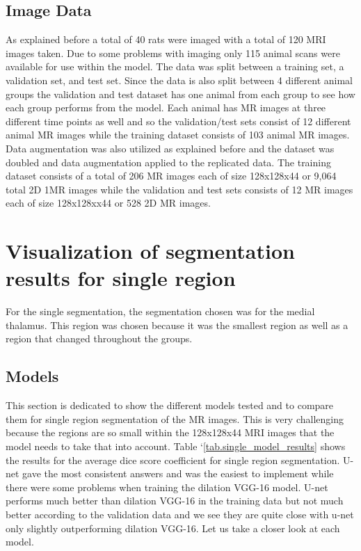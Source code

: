 \subsection{Image Data}
    As explained before a total of 40 rats were imaged with a total of 120 MRI images taken. 
    Due to some problems with imaging only 115 animal scans were available for use within the model. 
    The data was split between a training set, a validation set, and test set. 
    Since the data is also split between 4 different animal groups the validation and test dataset has one animal from each group to see how each group performs from the model. 
   Each animal has MR images at three different time points as well and so the validation/test sets consist of 12 different animal MR images while the training dataset consists of 103 animal MR images. 
    Data augmentation was also utilized as explained before and the dataset was doubled and data augmentation applied to the replicated data. 
    The training dataset consists of a total of 206 MR images each of size 128x128x44 or 9,064 total 2D 1MR images while the validation and test sets consists of 12 MR images each of size 128x128xx44 or 528 2D MR images. 

\section{Visualization of segmentation results for single region}
    For the single segmentation, the segmentation chosen was for the medial thalamus. 
    This region was chosen because it was the smallest region as well as a region that changed throughout the groups.
    

\subsection{Models}
    This section is dedicated to show the different models tested and to compare them for single region segmentation of the MR images. 
    This is very challenging because the regions are so small within the 128x128x44 MRI images that the model needs to take that into account. 
    Table `\ref{tab.single_model_results} shows the results for the average dice score coefficient for single region segmentation.
    U-net gave the most consistent answers and was the easiest to implement while there were some problems when training the dilation VGG-16 model.
    U-net performs much better than dilation VGG-16 in the training data but not much better according to the validation data and we see they are quite close with u-net only slightly outperforming dilation VGG-16. 
    Let us take a closer look at each model.
    
